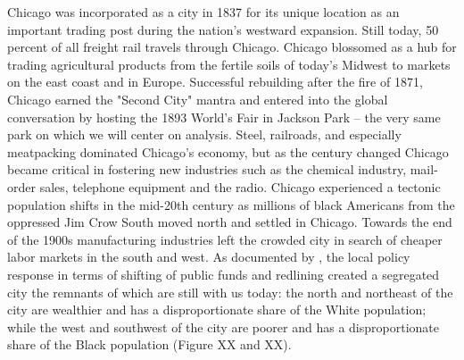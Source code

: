 \documentclass[12pt]{article}
\begin{document}
Chicago was incorporated as a city in 1837 for its unique location as an important trading post during the nation's westward expansion. Still today, 50 percent of all freight rail travels through Chicago. Chicago blossomed as a hub for trading agricultural products from the fertile soils of today's Midwest to markets on the east coast and in Europe. Successful rebuilding after the fire of 1871, Chicago earned the "Second City" mantra and entered into the global conversation by hosting the 1893 World's Fair in Jackson Park -- the very same park on which we will center on analysis. Steel, railroads, and especially meatpacking dominated Chicago's economy, but as the century changed Chicago became critical in fostering new industries such as the chemical industry, mail-order sales, telephone equipment and the radio. Chicago experienced a tectonic population shifts in the mid-20th century as millions of black Americans from the oppressed Jim Crow South moved north and settled in Chicago. Towards the end of the 1900s manufacturing industries left the crowded city in search of cheaper labor markets in the south and west. As documented by \citet{derenoncourt2022}, the local policy response in terms of shifting of public funds and redlining created a segregated city the remnants of which are still with us today: the north and northeast of the city are wealthier and has a disproportionate share of the White population; while the west and southwest of the city are poorer and has a disproportionate share of the Black population (Figure XX and XX). \citep{southside2022}
\end{document}
